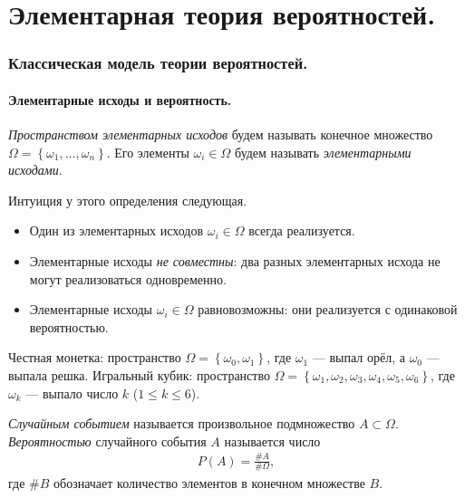 \documentclass[../main.tex]{subfiles}
\begin{document}
\part{Элементарная теория вероятностей.}

\section{Классическая модель теории вероятностей.}

\subsection{Элементарные исходы и вероятность.}
\label{subsection:def_of_elem_model}

\begin{df}
 \label{def:elementary_prob_space}
 \textit{Пространством элементарных исходов} будем называть конечное множество $\Omega = \left\{ \omega_1, \ldots, \omega_n \right\}$. Его элементы $ \omega_i \in \Omega $ будем называть \textit{элементарными исходами}.

 Интуиция у этого определения следующая.
 \begin{itemize}
  \item Один из элементарных исходов $ \omega_i \in \Omega $ всегда реализуется.
  \item Элементарные исходы \textit{не совместны}: два разных элементарных исхода не могут реализоваться одновременно.
  \item Элементарные исходы $ \omega_i\in\Omega $ равновозможны: они реализуется с одинаковой вероятностью.
 \end{itemize}
\end{df}
\begin{exmpl*}
 Честная монетка: пространство $ \Omega = \left\{ \omega_0, \omega_1 \right\} $, где $ \omega_1 $ --- выпал орёл, а $ \omega_0 $ --- выпала решка.
 Игральный кубик: пространство $ \Omega = \left\{ \omega_1, \omega_2, \omega_3, \omega_4, \omega_5, \omega_6 \right\} $, где $ \omega_k $ --- выпало число $ k $ ($ 1\leqslant k \leqslant 6 $).
\end{exmpl*}

\begin{df}
 \textit{Случайным событием} называется произвольное подмножество $A \subset \Omega$. \textit{Вероятностью} случайного события $A$ называется число
 \begin{align*}
  P(A) = \frac{\# A}{\# \Omega}
 ,\end{align*} где $\# B$ обозначает количество элементов в конечном множестве $B$.
\end{df}
\end{document}

